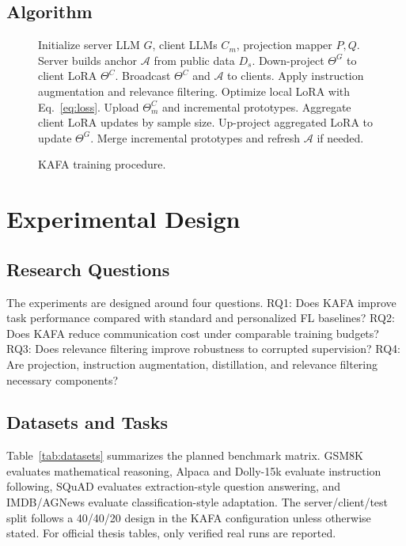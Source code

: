 \documentclass[conference]{IEEEtran}
\begin{document}
\subsection{Algorithm}
\begin{figure}[t]
\begin{minipage}{0.98\linewidth}
\small
\begin{algorithmic}[1]
\STATE Initialize server LLM $G$, client LLMs $C_m$, projection mapper $P,Q$.
\STATE Server builds anchor $\mathcal{A}$ from public data $D_s$.
    \STATE Down-project $\Theta^G$ to client LoRA $\Theta^C$.
    \STATE Broadcast $\Theta^C$ and $\mathcal{A}$ to clients.
        \STATE Apply instruction augmentation and relevance filtering.
        \STATE Optimize local LoRA with Eq.~\eqref{eq:loss}.
        \STATE Upload $\Theta_m^C$ and incremental prototypes.
    \ENDFOR
    \STATE Aggregate client LoRA updates by sample size.
    \STATE Up-project aggregated LoRA to update $\Theta^G$.
    \STATE Merge incremental prototypes and refresh $\mathcal{A}$ if needed.
\ENDFOR
\end{algorithmic}
\end{minipage}
\caption{KAFA training procedure.}
\label{alg:kafa}
\end{figure}

\section{Experimental Design}
\subsection{Research Questions}
The experiments are designed around four questions. RQ1: Does KAFA improve task performance compared with standard and personalized FL baselines? RQ2: Does KAFA reduce communication cost under comparable training budgets? RQ3: Does relevance filtering improve robustness to corrupted supervision? RQ4: Are projection, instruction augmentation, distillation, and relevance filtering necessary components?

\subsection{Datasets and Tasks}
Table~\ref{tab:datasets} summarizes the planned benchmark matrix. GSM8K evaluates mathematical reasoning, Alpaca and Dolly-15k evaluate instruction following, SQuAD evaluates extraction-style question answering, and IMDB/AGNews evaluate classification-style adaptation. The server/client/test split follows a 40/40/20 design in the KAFA configuration unless otherwise stated. For official thesis tables, only verified real runs are reported.
\end{document}
